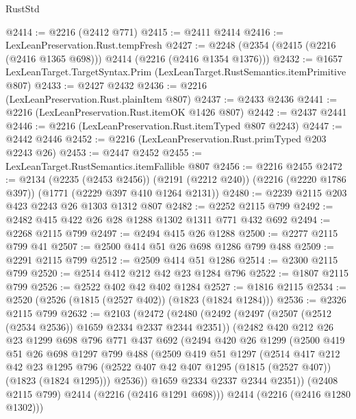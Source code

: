 \begin{lexlean}{RustStd}
\begin{coremodule}
@2414 := @2216 (@2412 @771)
@2415 := @2411 @2414
@2416 := LexLeanPreservation.Rust.tempFresh
@2427 := @2248 (@2354 (@2415 (@2216 (@2416 @1365 @698))) @2414 (@2216 (@2416 @1354 @1376)))
@2432 := @1657 LexLeanTarget.TargetSyntax.Prim (LexLeanTarget.RustSemantics.itemPrimitive @807)
@2433 := @2427 @2432
@2436 := @2216 (LexLeanPreservation.Rust.plainItem @807)
@2437 := @2433 @2436
@2441 := @2216 (LexLeanPreservation.Rust.itemOK @1426 @807)
@2442 := @2437 @2441
@2446 := @2216 (LexLeanPreservation.Rust.itemTyped @807 @2243)
@2447 := @2442 @2446
@2452 := @2216 (LexLeanPreservation.Rust.primTyped @203 @2243 @26)
@2453 := @2447 @2452
@2455 := LexLeanTarget.RustSemantics.itemFallible @807
@2456 := @2216 @2455
@2472 := @2134
    (@2235 (@2453 @2456))
    (@2191 (@2212 @240))
    (@2216 (@2220 @1786 @397))
    (@1771 (@2229 @397 @410 @1264 @2131))
@2480 := @2239 @2115 @203 @423 @2243 @26 @1303 @1312 @807
@2482 := @2252 @2115 @799
@2492 := @2482 @415 @422 @26 @28 @1288 @1302 @1311 @771 @432 @692
@2494 := @2268 @2115 @799
@2497 := @2494 @415 @26 @1288
@2500 := @2277 @2115 @799 @41
@2507 := @2500 @414 @51 @26 @698 @1286 @799 @488
@2509 := @2291 @2115 @799
@2512 := @2509 @414 @51 @1286
@2514 := @2300 @2115 @799
@2520 := @2514 @412 @212 @42 @23 @1284 @796
@2522 := @1807 @2115 @799
@2526 := @2522 @402 @42 @402 @1284
@2527 := @1816 @2115
@2534 := @2520 (@2526 (@1815 (@2527 @402)) (@1823 (@1824 @1284)))
@2536 := @2326 @2115 @799
@2632 := @2103
    (@2472
      (@2480
        (@2492
          (@2497 (@2507 (@2512 (@2534 @2536)) @1659 @2334 @2337 @2344 @2351))
          (@2482
            @420
            @212
            @26
            @23
            @1299
            @698
            @796
            @771
            @437
            @692
            (@2494
              @420
              @26
              @1299
              (@2500
                @419
                @51
                @26
                @698
                @1297
                @799
                @488
                (@2509
                  @419
                  @51
                  @1297
                  (@2514
                    @417
                    @212
                    @42
                    @23
                    @1295
                    @796
                    (@2522 @407 @42 @407 @1295 (@1815 (@2527 @407)) (@1823 (@1824 @1295)))
                    @2536))
                @1659
                @2334
                @2337
                @2344
                @2351))
            (@2408 @2115 @799)
            @2414
            (@2216 (@2416 @1291 @698)))
          @2414
          (@2216 (@2416 @1280 @1302)))

\end{coremodule}
\end{lexlean}
